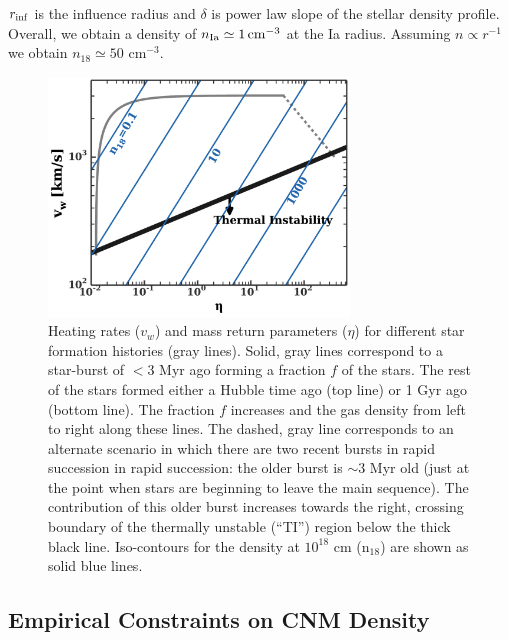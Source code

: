 \documentclass[usenatbib,fleqn]{mnras}
\begin{document}
$r_{\rm inf}$ is the influence radius and $\delta$
is power law slope of the stellar density profile. Overall, we obtain
a density of $n_{\rm Ia} \simeq 1 \, {\rm cm}^{-3}$ at the Ia
radius. Assuming $n\propto r^{-1}$ we obtain $n_{18}\simeq 50$ cm$^{-3}$. 

 

\begin{figure} 
  \includegraphics[width=8cm]{cnm_plot.pdf}
  \caption{\label{fig:param} Heating rates ($v_w$) and mass return
    parameters ($\eta$) for different star formation histories (gray
    lines). Solid, gray lines correspond to a star-burst of $<3$ Myr
    ago forming a fraction $f$ of the stars. The rest of the stars
    formed either a Hubble time ago (top line) or 1 Gyr ago (bottom
    line). The fraction $f$ increases and the gas density from left to
    right along these lines. The dashed, gray line corresponds to an
    alternate scenario in which there are two recent bursts in rapid
    succession in rapid succession: the older burst is $\sim 3$ Myr
    old (just at the point when stars are beginning to leave the main
    sequence). The contribution of this older burst increases towards
    the right, crossing boundary of the thermally unstable (``TI'')
    region below the thick black line. Iso-contours for the density at
    $10^{18}$ cm ($\mathrm{n_{18}}$) are shown as solid blue lines.} 
\end{figure}


\subsection{Empirical Constraints on CNM Density}
\end{document}
